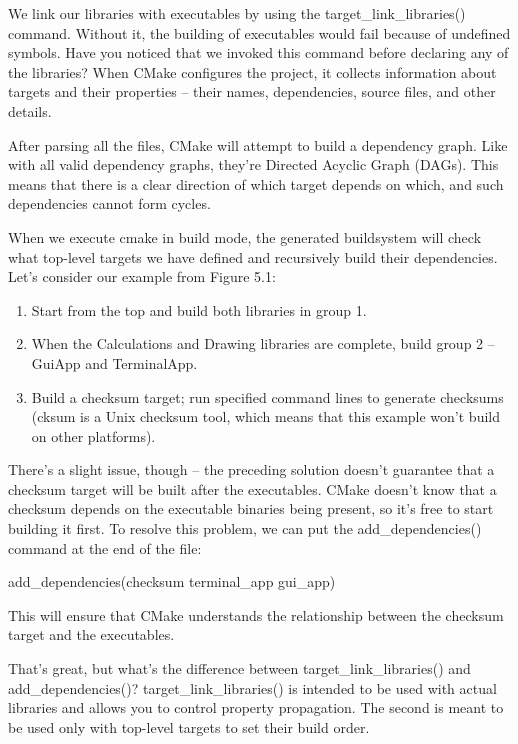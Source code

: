We link our libraries with executables by using the target\_link\_libraries() command. Without it, the building of executables would fail because of undefined symbols. Have you noticed that we invoked this command before declaring any of the libraries? When CMake configures the project, it collects information about targets and their properties – their names, dependencies, source files, and other details.

After parsing all the files, CMake will attempt to build a dependency graph. Like with all valid dependency graphs, they’re Directed Acyclic Graph (DAGs). This means that there is a clear direction of which target depends on which, and such dependencies cannot form cycles.

When we execute cmake in build mode, the generated buildsystem will check what top-level targets we have defined and recursively build their dependencies. Let’s consider our example from Figure 5.1:

\begin{enumerate}
\item
Start from the top and build both libraries in group 1.

\item
When the Calculations and Drawing libraries are complete, build group 2 – GuiApp and TerminalApp.

\item
Build a checksum target; run specified command lines to generate checksums (cksum is a Unix checksum tool, which means that this example won’t build on other platforms).
\end{enumerate}

There’s a slight issue, though – the preceding solution doesn’t guarantee that a checksum target will be built after the executables. CMake doesn’t know that a checksum depends on the executable binaries being present, so it’s free to start building it first. To resolve this problem, we can put the add\_dependencies() command at the end of the file:

\begin{cmake}
add_dependencies(checksum terminal_app gui_app)
\end{cmake}

This will ensure that CMake understands the relationship between the checksum target and the executables.

That’s great, but what’s the difference between target\_link\_libraries() and add\_dependencies()? target\_link\_libraries() is intended to be used with actual libraries and allows you to control property propagation. The second is meant to be used only with top-level targets to set their build order.

